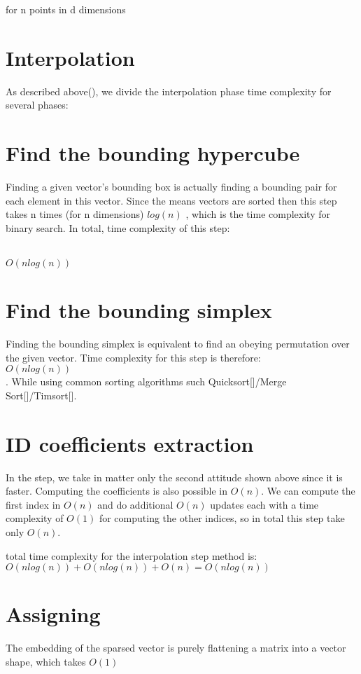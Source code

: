     for n points in d dimensions
	






\section{Interpolation}

As described above(), we divide the interpolation phase time complexity for several phases:




\section{Find the bounding hypercube}

Finding a given vector’s bounding box is actually finding a bounding pair for each element in this vector. Since the means vectors are sorted then this step takes n times (for n dimensions) $log(n)$ , which is the time complexity for binary search.
In total, time complexity of this step:  

\\
\textbf{$O(nlog(n))$}
\\


\section{Find the bounding simplex}


Finding the bounding simplex is equivalent to find an obeying permutation over the given vector.
Time complexity for this step is therefore: \\$O(nlog(n))$\\. While using common sorting algorithms such Quicksort[]/Merge Sort[]/Timsort[].








\section{ID coefficients extraction}

In the step, we take in matter only the second attitude shown above since it is faster.
Computing the coefficients is also possible in $O(n)$.
We can compute the first index in $O(n)$ and do additional $O(n)$ updates each with a time complexity of $O(1)$ for computing the other indices, so in total this step take only $O(n)$.

total time complexity for the interpolation step method is: \\

$ O(nlog(n)) + O(nlog(n)) + O(n) = O(nlog(n)) $





\section{Assigning}

The embedding of the sparsed vector is purely flattening a matrix into a vector shape, which takes $O(1)$


